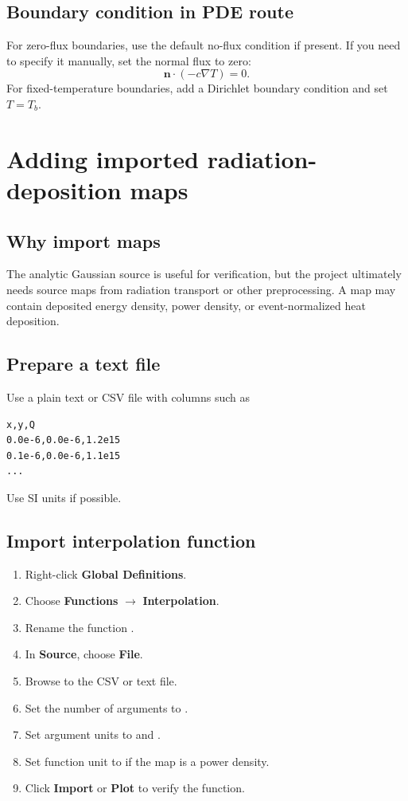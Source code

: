 \documentclass[11pt]{article}
\newcommand{\type}[1]{\texttt{\detokenize{#1}}}
\newcommand{\menu}[1]{\textbf{#1}}
\begin{document}
\subsection{Boundary condition in PDE route}
For zero-flux boundaries, use the default no-flux condition if present.  If you need to specify it manually, set the normal flux to zero:
\begin{equation}
\mathbf{n}\cdot(-c\nabla T)=0.
\end{equation}
For fixed-temperature boundaries, add a Dirichlet boundary condition and set \(T=T_b\).

\section{Adding imported radiation-deposition maps}

\subsection{Why import maps}
The analytic Gaussian source is useful for verification, but the project ultimately needs source maps from radiation transport or other preprocessing.  A map may contain deposited energy density, power density, or event-normalized heat deposition.

\subsection{Prepare a text file}
Use a plain text or CSV file with columns such as
\begin{lstlisting}
x,y,Q
0.0e-6,0.0e-6,1.2e15
0.1e-6,0.0e-6,1.1e15
...
\end{lstlisting}
Use SI units if possible.

\subsection{Import interpolation function}
\begin{enumerate}
\item Right-click \menu{Global Definitions}.
\item Choose \menu{Functions} \(\rightarrow\) \menu{Interpolation}.
\item Rename the function \type{Qmap}.
\item In \menu{Source}, choose \menu{File}.
\item Browse to the CSV or text file.
\item Set the number of arguments to \type{2}.
\item Set argument units to \type{m} and \type{m}.
\item Set function unit to \type{W/m^3} if the map is a power density.
\item Click \menu{Import} or \menu{Plot} to verify the function.
\end{enumerate}
\end{document}
